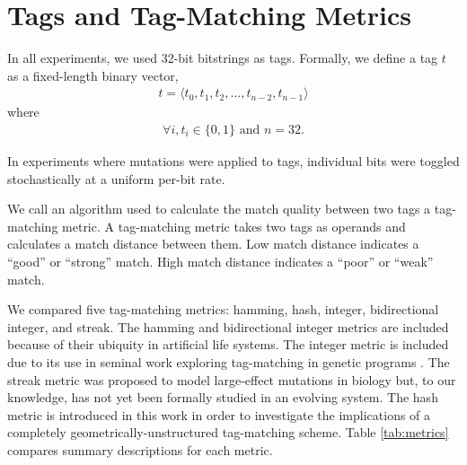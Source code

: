 \section{Tags and Tag-Matching Metrics}



In all experiments, we used 32-bit bitstrings as tags.
Formally, we define a tag $t$ as a fixed-length binary vector,
\begin{align*}
t = \langle t_0, t_1, t_2, \dots, t_{n-2}, t_{n-1} \rangle
\end{align*}
where
\begin{align*}
\forall i, t_i \in \{0, 1\} \text{ and } n=32.
\end{align*}

In experiments where mutations were applied to tags, individual bits were toggled stochastically at a uniform per-bit rate.

We call an algorithm used to calculate the match quality between two tags a tag-matching metric.
A tag-matching metric takes two tags as operands and calculates a match distance between them.
Low match distance indicates a ``good'' or ``strong'' match.
High match distance indicates a ``poor'' or ``weak'' match.

We compared five tag-matching metrics: hamming, hash, integer, bidirectional integer, and streak.
The hamming and bidirectional integer metrics are included because of their ubiquity in artificial life systems.
The integer metric is included due to its use in seminal work exploring tag-matching in genetic programs \citep{spector2011tag, spector2011s,spector2012tag}.
The streak metric was proposed to model large-effect mutations in biology but, to our knowledge, has not yet been formally studied in an evolving system.
The hash metric is introduced in this work in order to investigate the implications of a completely geometrically-unstructured tag-matching scheme.
Table \ref{tab:metrics} compares summary descriptions for each metric.


